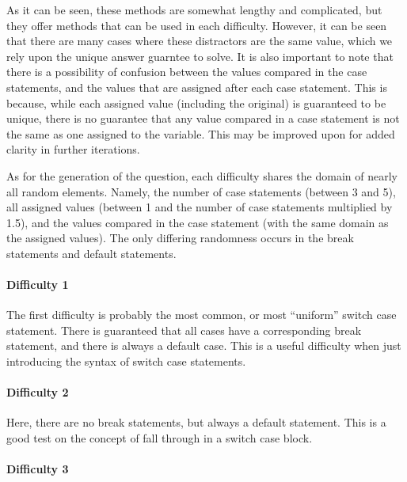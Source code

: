 \documentclass{article}
\begin{document}
As it can be seen, these methods are somewhat lengthy and complicated, but they offer methods that can be used in each difficulty. However, it can be seen that there are many cases where 
these distractors are the same value, which we rely upon the unique answer guarntee to solve. It is also important to note that there is a possibility of confusion between the values compared 
in the case statements, and the values that are assigned after each case statement. This is because, while each assigned value (including the original) is guaranteed to be unique, there is no
guarantee that any value compared in a case statement is not the same as one assigned to the variable. This may be improved upon for added clarity in further iterations. 

As for the generation of the question, each difficulty shares the domain of nearly all random elements. Namely, the number of case statements (between 3 and 5), all 
assigned values (between 1 and the number of case statements multiplied by 1.5), and the values compared in the case statement (with the same domain as the assigned values). The only 
differing randomness occurs in the break statements and default statements.

\paragraph{Difficulty 1} \hfill \par

The first difficulty is probably the most common, or most ``uniform'' switch case statement. There is guaranteed that all cases have a corresponding break statement, and there is always a
default case. This is a useful difficulty when just introducing the syntax of switch case statements.

\paragraph{Difficulty 2} \hfill \par

Here, there are no break statements, but always a default statement. This is a good test on the concept of fall through in a switch case block.

\paragraph{Difficulty 3} \hfill \par
\end{document}
